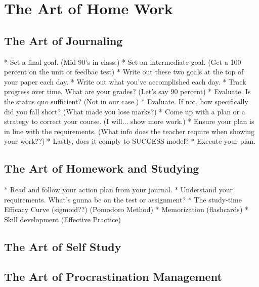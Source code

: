 \chapter{The Art of Home Work}

\section{The Art of Journaling}

* Set a final goal. (Mid 90's in class.)
* Set an intermediate goal. (Get a 100 percent on the unit or feedbac test)
* Write out these two goals at the top of your paper each day. 
* Write out what you've accomplished each day. 
* Track progress over time. What are your grades? (Let's say 90 percent)
* Evaluate. Is the status quo sufficient? (Not in our case.)
* Evaluate. If not, how specifically did you fall short? (What made you lose marks?)
* Come up with a plan or a strategy to correct your course. (I will... show more work.)
* Ensure your plan is in line with the requirements. (What info does the teacher require when showing your work??)
* Lastly, does it comply to SUCCESS model? 
* Execute your plan. 

\section{The Art of Homework and Studying}

* Read and follow your action plan from your journal. 
* Understand your requirements. What's gunna be on the test or assignment? 
* The study-time Efficacy Curve (sigmoid??) (Pomodoro Method)
* Memorization (flashcards)
* Skill development (Effective Practice)

\section{The Art of Self Study}

\section{The Art of Procrastination Management}
